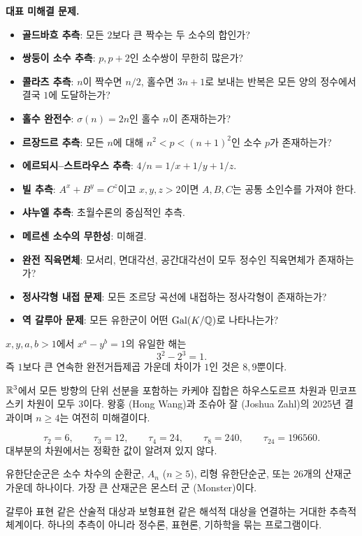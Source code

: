 
\noindent\textbf{대표 미해결 문제.}
\begin{itemize}
\item \textbf{골드바흐 추측}: 모든 $2$보다 큰 짝수는 두 소수의 합인가?
\item \textbf{쌍둥이 소수 추측}: $p,p+2$인 소수쌍이 무한히 많은가?
\item \textbf{콜라츠 추측}: $n$이 짝수면 $n/2$, 홀수면 $3n+1$로 보내는 반복은 모든 양의 정수에서 결국 $1$에 도달하는가?
\item \textbf{홀수 완전수}: $\sigma(n)=2n$인 홀수 $n$이 존재하는가?
\item \textbf{르장드르 추측}: 모든 $n$에 대해 $n^2<p<(n+1)^2$인 소수 $p$가 존재하는가?
\item \textbf{에르되시--스트라우스 추측}: $4/n=1/x+1/y+1/z$.
\item \textbf{빌 추측}: $A^x+B^y=C^z$이고 $x,y,z>2$이면 $A,B,C$는 공통 소인수를 가져야 한다.
\item \textbf{샤누엘 추측}: 초월수론의 중심적인 추측.
\item \textbf{메르센 소수의 무한성}: 미해결.
\item \textbf{완전 직육면체}: 모서리, 면대각선, 공간대각선이 모두 정수인 직육면체가 존재하는가?
\item \textbf{정사각형 내접 문제}: 모든 조르당 곡선에 내접하는 정사각형이 존재하는가?
\item \textbf{역 갈루아 문제}: 모든 유한군이 어떤 $\operatorname{Gal}(K/\mathbb{Q})$로 나타나는가?
\end{itemize}

\begin{theorem}
$x,y,a,b>1$에서 $x^a-y^b=1$의 유일한 해는
\[
3^2-2^3=1.
\]
즉 $1$보다 큰 연속한 완전거듭제곱 가운데 차이가 $1$인 것은 $8,9$뿐이다.
\end{theorem}

\begin{theorem}[3차원 카케야 정리]
$\mathbb{R}^3$에서 모든 방향의 단위 선분을 포함하는 카케야 집합은 하우스도르프 차원과 민코프스키 차원이 모두 $3$이다. 왕훙 (Hong Wang)과 조슈아 잘 (Joshua Zahl)의 2025년 결과이며 $n\ge4$는 여전히 미해결이다.
\end{theorem}

\begin{fact}[키싱 넘버]
\[
\tau_2=6,\qquad \tau_3=12,\qquad \tau_4=24,\qquad \tau_8=240,\qquad \tau_{24}=196560.
\]
대부분의 차원에서는 정확한 값이 알려져 있지 않다.
\end{fact}

\begin{fact}[유한단순군 분류]
유한단순군은 소수 차수의 순환군, $A_n$ ($n\ge5$), 리형 유한단순군, 또는 26개의 산재군 가운데 하나이다. 가장 큰 산재군은 몬스터 군 (Monster)이다.
\end{fact}

\begin{fact}
갈루아 표현 같은 산술적 대상과 보형표현 같은 해석적 대상을 연결하는 거대한 추측적 체계이다. 하나의 추측이 아니라 정수론, 표현론, 기하학을 묶는 프로그램이다.
\end{fact}
